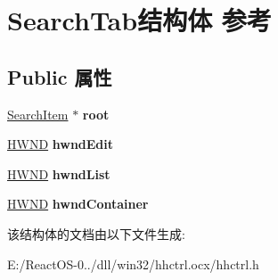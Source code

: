 \hypertarget{struct_search_tab}{}\section{Search\+Tab结构体 参考}
\label{struct_search_tab}
\subsection*{Public 属性}
\begin{DoxyCompactItemize}
\item 
\mbox{\label{struct_search_tab_a85cafffe8615872f397c0caebe9df5cc}} 
\hyperlink{struct_search_item}{Search\+Item} $\ast$ {\bfseries root}
\item 
\mbox{\label{struct_search_tab_a66cbcbfdc9013b2a801230f498bfa9c9}} 
\hyperlink{interfacevoid}{H\+W\+ND} {\bfseries hwnd\+Edit}
\item 
\mbox{\label{struct_search_tab_a3bd01ba79827723e3aa3f7548b2012f0}} 
\hyperlink{interfacevoid}{H\+W\+ND} {\bfseries hwnd\+List}
\item 
\mbox{\label{struct_search_tab_a1b3e2d60790b6f7bc55cb4787287dd8a}} 
\hyperlink{interfacevoid}{H\+W\+ND} {\bfseries hwnd\+Container}
\end{DoxyCompactItemize}


该结构体的文档由以下文件生成\+:\begin{DoxyCompactItemize}
\item 
E\+:/\+React\+O\+S-\/0../dll/win32/hhctrl.\+ocx/hhctrl.\+h\end{DoxyCompactItemize}
